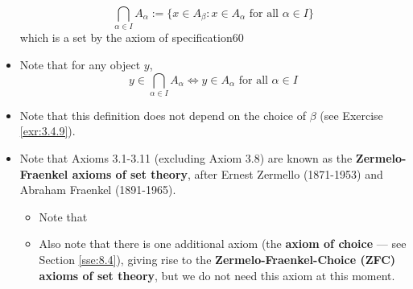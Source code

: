 \documentclass[../main.tex]{subfiles}
\begin{document}
\begin{itemize}
{    \begin{equation}\label{eqn:intersection}
        \bigcap_{\alpha\in I}A_\alpha := \{x\in A_\beta:x\in A_\alpha\text{ for all }\alpha\in I\}
    \end{equation}
    which is a set by the axiom of specification}{60}
    \item Note that for any object $y$,
    \begin{equation}\label{eqn:intersectionElements}
        y\in\bigcap_{\alpha\in I}A_\alpha \Longleftrightarrow y\in A_\alpha\text{ for all }\alpha\in I
    \end{equation}
    \item Note that this definition does not depend on the choice of $\beta$ (see Exercise \ref{exr:3.4.9}).
    \item Note that Axioms 3.1-3.11 (excluding Axiom 3.8) are known as the \textbf{Zermelo-Fraenkel axioms of set theory}, after Ernest Zermello (1871-1953) and Abraham Fraenkel (1891-1965).
    \begin{itemize}
        \item Note that 
        \item Also note that there is one additional axiom (the \textbf{axiom of choice} --- see Section \ref{sse:8.4}), giving rise to the \textbf{Zermelo-Fraenkel-Choice (ZFC) axioms of set theory}, but we do not need this axiom at this moment.
    \end{itemize}
\end{itemize}
\end{document}
